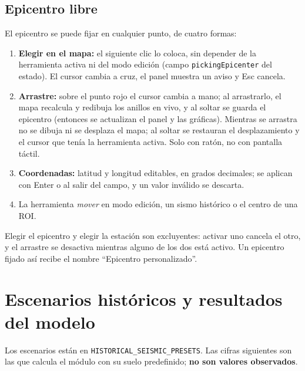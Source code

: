 \documentclass[11pt,a4paper]{article}
\begin{document}
\subsection{Epicentro libre}
El epicentro se puede fijar en cualquier punto, de cuatro formas:
\begin{enumerate}
  \item \textbf{Elegir en el mapa:} el siguiente clic lo coloca, sin depender de la herramienta activa
        ni del modo edición (campo \texttt{pickingEpicenter} del estado). El cursor cambia a cruz,
        el panel muestra un aviso y Esc cancela.
  \item \textbf{Arrastre:} sobre el punto rojo el cursor cambia a mano; al arrastrarlo, el mapa
        recalcula y redibuja los anillos en vivo, y al soltar se guarda el epicentro (entonces se
        actualizan el panel y las gráficas). Mientras se arrastra no se dibuja ni se desplaza el mapa;
        al soltar se restauran el desplazamiento y el cursor que tenía la herramienta activa. Solo con
        ratón, no con pantalla táctil.
  \item \textbf{Coordenadas:} latitud y longitud editables, en grados decimales; se aplican con Enter o
        al salir del campo, y un valor inválido se descarta.
  \item La herramienta \emph{mover} en modo edición, un sismo histórico o el centro de una ROI.
\end{enumerate}
Elegir el epicentro y elegir la estación son excluyentes: activar uno cancela el otro, y el arrastre
se desactiva mientras alguno de los dos está activo. Un epicentro fijado así recibe el nombre
``Epicentro personalizado''.

\section{Escenarios históricos y resultados del modelo}

Los escenarios están en \texttt{HISTORICAL\_SEISMIC\_PRESETS}. Las cifras siguientes son las que
calcula el módulo con su suelo predefinido; \textbf{no son valores observados}.
\end{document}
